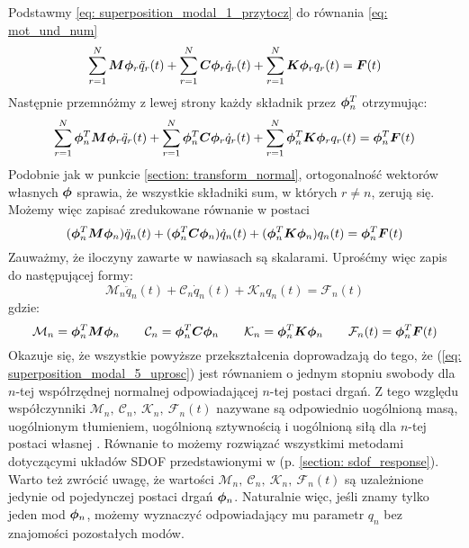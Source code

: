 Podstawmy \ref{eq: superposition_modal_1_przytocz} do równania \ref{eq: mot_und_num}
\begin{equation} \label{eq: superposition_modal_2_podstaw}
	\sum_{r=1}^{N} \bm{M} \bm{\phi}_r \ddot{q}_r(t) +\sum_{r=1}^{N} \bm{C}\bm{\phi}_r \dot{q}_r(t) + \sum_{r=1}^{N} \bm{K}\bm{\phi}_r q_r(t) = \bm{F}(t)
\end{equation} 
Następnie przemnóżmy z lewej strony każdy składnik przez $\bm{\phi}_n^T$ otrzymując:
\begin{equation} \label{eq: superposition_modal_3_przemnoz}
	\sum_{r=1}^{N} \bm{\phi}_n^T \bm{M} \bm{\phi}_r \ddot{q}_r(t) +\sum_{r=1}^{N} \bm{\phi}_n^T \bm{C}\bm{\phi}_r \dot{q}_r(t) + \sum_{r=1}^{N} \bm{\phi}_n^T \bm{K}\bm{\phi}_r q_r(t) = \bm{\phi}_n^T \bm{F}(t)
\end{equation} 
Podobnie jak w punkcie \ref{section: transform_normal}, ortogonalność wektorów własnych $\bm{\phi}$ sprawia, że wszystkie składniki sum, w których $r\neq n$, zerują się. Możemy więc zapisać zredukowane równanie w postaci
\begin{equation} \label{eq: superposition_modal_4_orto}
	 (\bm{\phi}_n^T \bm{M} \bm{\phi}_n )\ddot{q}_n(t) + (\bm{\phi}_n^T \bm{C}\bm{\phi}_n) \dot{q}_n(t) + (\bm{\phi}_n^T \bm{K}\bm{\phi}_n) q_n(t) = \bm{\phi}_n^T \bm{F}(t)
\end{equation} 
Zauważmy, że iloczyny zawarte w nawiasach są skalarami. Uprośćmy więc zapis do następującej formy:
\begin{equation} \label{eq: superposition_modal_5_uprosc}
	\mathcal{M}_n\ddot{q}_n(t) + \mathcal{C}_n\dot{q}_n(t) + \mathcal{K}_n q_n(t) = \mathcal{F}_n(t)
\end{equation} 
gdzie:
\begin{equation} \label{eq: superposition_modal_6_podstawki}
	\mathcal{M}_n= \bm{\phi}_n^T \bm{M} \bm{\phi}_n \qquad 
	\mathcal{C}_n= \bm{\phi}_n^T \bm{C} \bm{\phi}_n \qquad 
	\mathcal{K}_n= \bm{\phi}_n^T \bm{K} \bm{\phi}_n \qquad
	\mathcal{F}_n(t)= \bm{\phi}_n^T \bm{F}(t)
\end{equation} 
Okazuje się, że wszystkie powyższe przekształcenia doprowadzają do tego, że (\ref{eq: superposition_modal_5_uprosc}) jest równaniem o jednym stopniu swobody dla $n$-tej współrzędnej normalnej odpowiadającej $n$-tej postaci drgań. Z tego względu współczynniki $\mathcal{M}_n,\:\mathcal{C}_n,\:\mathcal{K}_n,\:\mathcal{F}_n(t)$ nazywane są odpowiednio uogólnioną masą, uogólnionym tłumieniem, uogólnioną sztywnością i uogólnioną siłą dla $n$-tej postaci własnej . Równanie to możemy rozwiązać wszystkimi metodami dotyczącymi układów SDOF przedstawionymi w (p. \ref{section: sdof_response}). Warto też zwrócić uwagę, że wartości $\mathcal{M}_n,\:\mathcal{C}_n,\:\mathcal{K}_n,\:\mathcal{F}_n(t)$ są uzależnione jedynie od pojedynczej postaci drgań $\bm{\phi}_n$. Naturalnie więc, jeśli znamy tylko jeden mod $\bm{\phi}_n$, możemy wyznaczyć odpowiadający mu parametr $q_n$ bez znajomości pozostałych modów.
